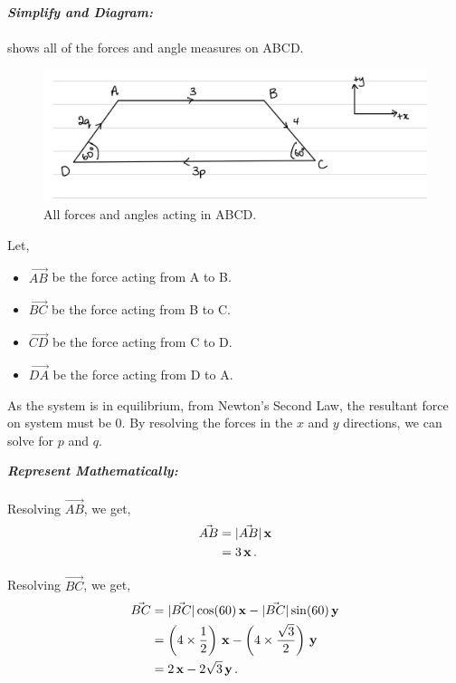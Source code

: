 \begin{subquestions}
\textbf{\textit{Simplify and Diagram:}} \\ \\ 
 shows all of the forces and angle measures on ABCD.
\begin{figure}[H]
	\begin{center}
		\includegraphics[scale=0.25]{../2007/figures/2008Mq6Diagram2}
		\caption{\label{2008M:q6:Diagram2} All forces and angles acting in ABCD.}
	\end{center}
\end{figure}

Let,
\begin{itemize}
	\item $\vec{AB}$ be the force acting from A to B.
	\item $\vec{BC}$ be the force acting from B to C.
	\item $\vec{CD}$ be the force acting from C to D.
	\item $\vec{DA}$ be the force acting from D to A.
\end{itemize}

As the system is in equilibrium, from Newton's Second Law, the resultant force on system must be 0. By resolving the forces in the $x$ and $y$ directions, we can solve for $p$ and $q$.




\textbf{\textit{Represent Mathematically:}} \\ \\
Resolving $\vec{AB}$, we get,
\begin{align}
	\vec{AB} & = |\vec{AB}|\,\mathbf{x} \nonumber \\
	         & = 3\,\mathbf{x} \,.
\end{align}

Resolving $\vec{BC}$, we get,
\begin{align}
	\vec{BC} & = |\vec{BC}|\cos(60)\,\mathbf{x} - |\vec{BC}|\sin(60)\,\mathbf{y} \nonumber \\
	         & = \left(4\times \frac{1}{2}\right)\,\mathbf{x} - \left(4\times \frac{\sqrt{3}}{2}\right)\,\mathbf{y} \nonumber \\
	         & = 2 \,\mathbf{x} - 2\sqrt{3}\,\mathbf{y} \,.
\end{align}


\end{subquestions}
